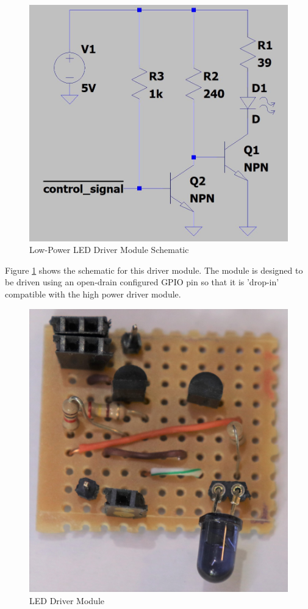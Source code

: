 \begin{figure}[H]
	\centering
	\includegraphics[width=.6\textwidth]{figures/design/low_power_led_driver.JPG}
	\caption{Low-Power LED Driver Module Schematic}
	\label{fig:schematic_low_power_led_driver}
\end{figure}

Figure \ref{fig:schematic_low_power_led_driver} shows the schematic for this driver module. The module is designed to be driven using an open-drain configured GPIO pin so that it is 'drop-in' compatible with the high power driver module.


\begin{figure}[H]
	\centering
	\includegraphics[width=.6\textwidth]{figures/modules/led_driver.jpg}
	\caption{LED Driver Module}
	\label{fig:module_led_driver}
\end{figure}








